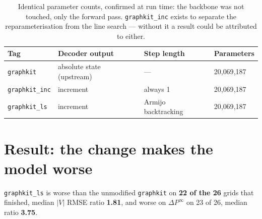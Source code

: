 \documentclass[10pt]{article}
\begin{document}
\begin{table}[H]
\centering\small
\begin{tabular}{llll}
\toprule
Tag & Decoder output & Step length & Parameters \\
\midrule
\texttt{graphkit}     & absolute state (upstream) & --- & 20{,}069{,}187 \\
\texttt{graphkit\_inc} & increment                & always 1 & 20{,}069{,}187 \\
\texttt{graphkit\_ls}  & increment                & Armijo backtracking & 20{,}069{,}187 \\
\bottomrule
\end{tabular}
\caption{Identical parameter counts, confirmed at run time: the backbone was not
touched, only the forward pass. \texttt{graphkit\_inc} exists to separate the
reparameterisation from the line search --- without it a result could be
attributed to either.}
\end{table}

\section{Result: the change makes the model worse}

\texttt{graphkit\_ls} is worse than the unmodified \texttt{graphkit} on
\textbf{22 of the 26} grids that finished, median $|V|$ RMSE ratio
\textbf{1.81}, and worse on $\Delta P^{\infty}$ on 23 of 26, median ratio
\textbf{3.75}.
\end{document}
